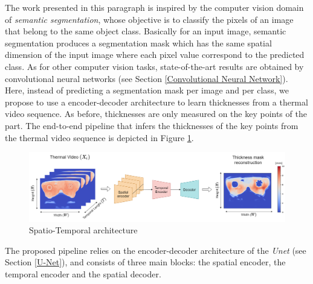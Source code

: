 The work presented in this paragraph is inspired by the computer vision domain of \textit{semantic segmentation}, whose objective is to classify  the pixels of an image that belong to the same object class. Basically for an input image, semantic segmentation produces a segmentation mask which has the same spatial dimension of the input image where each pixel value correspond to the predicted class. As for other computer vision tasks, state-of-the-art results are obtained by convolutional neural networks (see Section \ref{Convolutional Neural Network}).
Here, instead of predicting a segmentation mask per image and per class, we propose to use a encoder-decoder architecture to learn thicknesses from a thermal video sequence. As before, thicknesses are only measured on the key points of the part. The end-to-end pipeline that infers the thicknesses of the key points from the thermal video sequence is depicted in Figure \ref{fig:spatio_temporal_architecture}.
%
\begin{figure}
\centering
\includegraphics[scale=0.35]{images/chapter_4/Spatio-Temporal.png}
\caption{Spatio-Temporal architecture}
\label{fig:spatio_temporal_architecture}
\end{figure}
%
The proposed pipeline relies on the encoder-decoder architecture of the \textit{Unet} (see Section \ref{U-Net}), and consists of three main blocks: the spatial encoder, the temporal encoder and the spatial decoder. 

